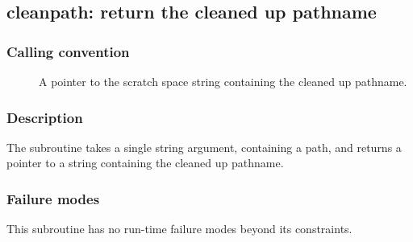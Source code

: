 \clearpage
{}
{}
\label{subr:cleanpath}
\subsection*{cleanpath: return the cleaned up pathname}

\subsubsection*{Calling convention}

\begin{description}
\item[] A pointer to the scratch space string containing the
	cleaned up pathname.
\end{description}

\subsubsection*{Description}

The  subroutine takes a single string argument, containing
a path, and returns a pointer to a string containing the cleaned up pathname.

\subsubsection*{Failure modes}

This subroutine has no run-time failure modes beyond its constraints.
